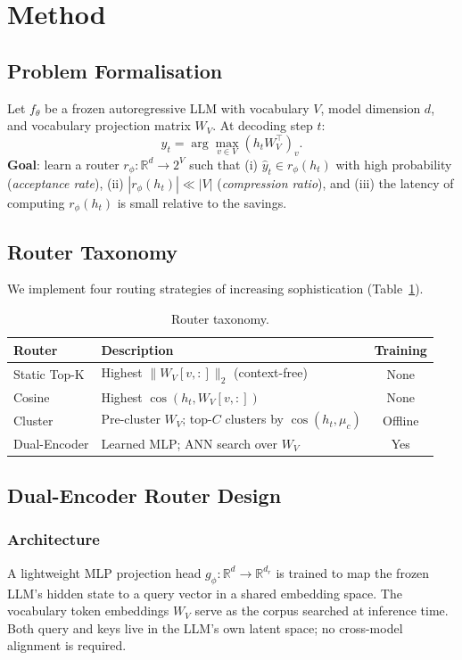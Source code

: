 \documentclass[twocolumn,10pt]{article}
\newcommand{\tblhead}[1]{\textbf{#1}}
\begin{document}
\section{Method}

\subsection{Problem Formalisation}

Let $f_\theta$ be a frozen autoregressive LLM with vocabulary $V$, model
dimension $d$, and vocabulary projection matrix $W_V$. At decoding step $t$:
\[
  \hat{y}_t = \arg\max_{v \in V}(h_t W_V^\top)_v.
\]
\textbf{Goal}: learn a router $r_\phi : \mathbb{R}^d \to 2^V$ such that
(i) $\hat{y}_t \in r_\phi(h_t)$ with high probability (\emph{acceptance
rate}), (ii) $|r_\phi(h_t)| \ll |V|$ (\emph{compression ratio}), and
(iii) the latency of computing $r_\phi(h_t)$ is small relative to the savings.

\subsection{Router Taxonomy}

We implement four routing strategies of increasing sophistication
(Table~\ref{tab:routers}).

\begin{table}[h]
\centering
\caption{Router taxonomy.}
\label{tab:routers}
\small
\begin{tabular}{@{}lp{4.0cm}c@{}}
\toprule
\tblhead{Router} & \tblhead{Description} & \tblhead{Training} \\
\midrule
Static Top-K & Highest $\|W_V[v,:]\|_2$ (context-free) & None \\
Cosine       & Highest $\cos(h_t, W_V[v,:])$           & None \\
Cluster      & Pre-cluster $W_V$; top-$C$ clusters by $\cos(h_t,\mu_c)$ & Offline \\
Dual-Encoder & Learned MLP; ANN search over $W_V$      & Yes \\
\bottomrule
\end{tabular}
\end{table}

\subsection{Dual-Encoder Router Design}

\subsubsection{Architecture}
A lightweight MLP projection head $g_\phi : \mathbb{R}^d \to \mathbb{R}^{d_r}$
is trained to map the frozen LLM's hidden state to a query vector in a shared
embedding space. The vocabulary token embeddings $W_V$ serve as the corpus
searched at inference time. Both query and keys live in the LLM's own latent
space; no cross-model alignment is required.
\end{document}

